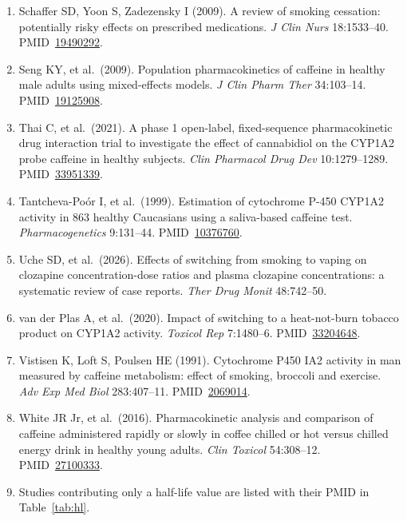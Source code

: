 \documentclass[10pt,a4paper]{article}
\newcommand{\pmid}[1]{PMID~\href{https://pubmed.ncbi.nlm.nih.gov/#1/}{#1}}
\begin{document}
\begin{enumerate}[leftmargin=*,label={}]
\item Schaffer SD, Yoon S, Zadezensky I (2009). A review of smoking cessation: potentially risky effects on prescribed medications. \emph{J Clin Nurs} 18:1533--40. \pmid{19490292}.
\item Seng KY, et al.\ (2009). Population pharmacokinetics of caffeine in healthy male adults using mixed-effects models. \emph{J Clin Pharm Ther} 34:103--14. \pmid{19125908}.
\item Thai C, et al.\ (2021). A phase 1 open-label, fixed-sequence pharmacokinetic drug interaction trial to investigate the effect of cannabidiol on the CYP1A2 probe caffeine in healthy subjects. \emph{Clin Pharmacol Drug Dev} 10:1279--1289. \pmid{33951339}.
\item Tantcheva-Po\'or I, et al.\ (1999). Estimation of cytochrome P-450 CYP1A2 activity in 863 healthy Caucasians using a saliva-based caffeine test. \emph{Pharmacogenetics} 9:131--44. \pmid{10376760}.
\item Uche SD, et al.\ (2026). Effects of switching from smoking to vaping on clozapine concentration-dose ratios and plasma clozapine concentrations: a systematic review of case reports. \emph{Ther Drug Monit} 48:742--50.
\item van der Plas A, et al.\ (2020). Impact of switching to a heat-not-burn tobacco product on CYP1A2 activity. \emph{Toxicol Rep} 7:1480--6. \pmid{33204648}.
\item Vistisen K, Loft S, Poulsen HE (1991). Cytochrome P450 IA2 activity in man measured by caffeine metabolism: effect of smoking, broccoli and exercise. \emph{Adv Exp Med Biol} 283:407--11. \pmid{2069014}.
\item White JR Jr, et al.\ (2016). Pharmacokinetic analysis and comparison of caffeine administered rapidly or slowly in coffee chilled or hot versus chilled energy drink in healthy young adults. \emph{Clin Toxicol} 54:308--12. \pmid{27100333}.
\item Studies contributing only a half-life value are listed with their PMID in Table~\ref{tab:hl}.
\end{enumerate}
\end{document}
